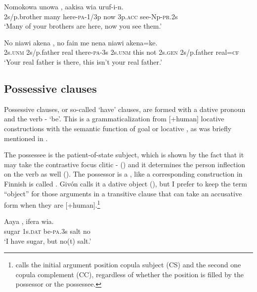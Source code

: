 \ea%
\label{ex:x1154}
\gll Nomokowa  unowa  ,  aakisa  wia  uruf-i-n.  \\
     2s/p.brother  many  here-\textsc{pa}-1/3p  now  3p.\textsc{acc}  see-Np-\textsc{pr}.2s \\
\glt `Many of your brothers are here, now you see them.'
\z

\ea%
\label{ex:x1155}
\gll No  niawi  akena  ,  no  fain me  nena  niawi  akena=ke. \\
     2s.\textsc{unm}  2s/p.father  real  there-\textsc{pa}-3s  2s.\textsc{unm}  this not  2s.\textsc{gen}  2s/p.father  real=\textsc{cf} \\
\glt `Your real father is there, this isn't your real father.'
\z

\subsection{Possessive clauses}
{}
Possessive clauses, or so-called `have' clauses, are formed with a dative pronoun and the verb - `be'. This is a grammaticalization from [+human] locative constructions with the semantic function of goal or locative \citep[50--61]{Heine1997}, as was briefly mentioned in .  

The possessee is the patient-of-state subject, which is shown by the fact that it may take the contrastive focus clitic - () and it determines the person inflection on the verb as well (). The possessor is a , like  a corresponding construction in Finnish is called \citep[209]{HakulinenEtAl1979}%
. Giv\'on calls it a dative object (\citeyear[104]{Givon1984}), but I prefer to keep the term ``object'' for those arguments in a transitive clause that can take an accusative form when they are [+human].\footnote{\citet[302]{Dixon2010b} calls the initial argument position copula subject (CS) and the second one copula complement (CC), regardless of whether the position is filled by the possessor or the possessee.}

\ea%
\label{ex:x595}
\gll Aaya    ,  ifera  wia. \\
     sugar  1s.\textsc{dat}  be-\textsc{pa}.3s  salt  no \\
\glt `I have sugar, but no(t) salt.'
\z

